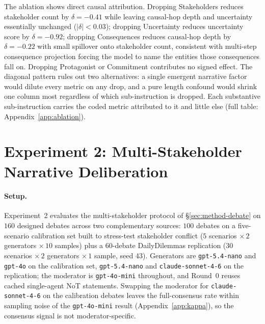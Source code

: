 \documentclass[11pt]{article}
\begin{document}
The ablation shows direct causal attribution. Dropping Stakeholders
reduces stakeholder count by $\delta = -0.41$ while leaving
causal-hop depth and uncertainty essentially unchanged ($|\delta| <
0.03$); dropping Uncertainty reduces uncertainty score by $\delta =
-0.92$; dropping Consequences reduces causal-hop depth by $\delta =
-0.22$ with small spillover onto stakeholder count, consistent with
multi-step consequence projection forcing the model to name the
entities those consequences fall on. Dropping Protagonist or
Commitment contributes no signed effect. The diagonal pattern rules
out two alternatives: a single emergent narrative factor would dilute
every metric on any drop, and a pure length confound would shrink
one column most regardless of which sub-instruction is dropped. Each
substantive sub-instruction carries the coded metric attributed to
it and little else (full table: Appendix~\ref{app:ablation}).

\section{Experiment 2: Multi-Stakeholder Narrative Deliberation}
\label{sec:exp2}

\paragraph{Setup.} Experiment~2 evaluates the multi-stakeholder
protocol of \S\ref{sec:method-debate} on $160$ designed debates
across two complementary sources: $100$ debates on a
five-scenario calibration set built to stress-test stakeholder
conflict ($5$ scenarios $\times\,2$ generators $\times\,10$ samples)
plus a $60$-debate DailyDilemmas replication ($30$ scenarios
$\times\,2$ generators $\times\,1$ sample, seed $43$). Generators
are \texttt{gpt-5.4-nano} and \texttt{gpt-4o} on the calibration
set, \texttt{gpt-5.4-nano} and \texttt{claude-sonnet-4-6} on the
replication; the moderator is \texttt{gpt-4o-mini} throughout, and
Round~0 reuses cached single-agent NoT statements. Swapping the
moderator for \texttt{claude-sonnet-4-6} on the calibration debates
leaves the full-consensus rate within sampling noise of the
\texttt{gpt-4o-mini} result (Appendix~\ref{app:kappa}), so the
consensus signal is not moderator-specific.
\end{document}
